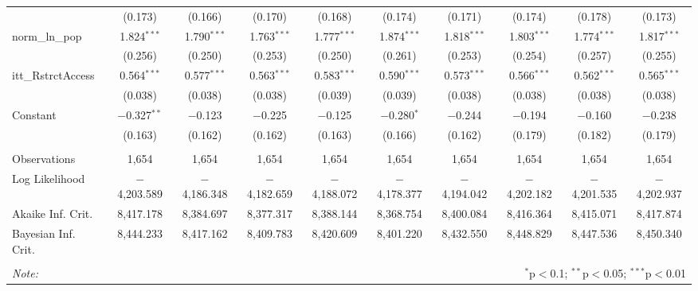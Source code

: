 \begin{sidewaystable}[!htbp]
\begin{tabular}{@{\extracolsep{5pt}}lccccccccc}
  & (0.173) & (0.166) & (0.170) & (0.168) & (0.174) & (0.171) & (0.174) & (0.178) & (0.173) \\ 
  norm\_ln\_pop & 1.824$^{***}$ & 1.790$^{***}$ & 1.763$^{***}$ & 1.777$^{***}$ & 1.874$^{***}$ & 1.818$^{***}$ & 1.803$^{***}$ & 1.774$^{***}$ & 1.817$^{***}$ \\ 
  & (0.256) & (0.250) & (0.253) & (0.250) & (0.261) & (0.253) & (0.254) & (0.257) & (0.255) \\ 
  itt\_RstrctAccess & 0.564$^{***}$ & 0.577$^{***}$ & 0.563$^{***}$ & 0.583$^{***}$ & 0.590$^{***}$ & 0.573$^{***}$ & 0.566$^{***}$ & 0.562$^{***}$ & 0.565$^{***}$ \\ 
  & (0.038) & (0.038) & (0.038) & (0.039) & (0.039) & (0.038) & (0.038) & (0.038) & (0.038) \\ 
  Constant & $-$0.327$^{**}$ & $-$0.123 & $-$0.225 & $-$0.125 & $-$0.280$^{*}$ & $-$0.244 & $-$0.194 & $-$0.160 & $-$0.238 \\ 
  & (0.163) & (0.162) & (0.162) & (0.163) & (0.166) & (0.162) & (0.179) & (0.182) & (0.179) \\ 
 \hline \\[-1.8ex] 
Observations & 1,654 & 1,654 & 1,654 & 1,654 & 1,654 & 1,654 & 1,654 & 1,654 & 1,654 \\ 
Log Likelihood & $-$4,203.589 & $-$4,186.348 & $-$4,182.659 & $-$4,188.072 & $-$4,178.377 & $-$4,194.042 & $-$4,202.182 & $-$4,201.535 & $-$4,202.937 \\ 
Akaike Inf. Crit. & 8,417.178 & 8,384.697 & 8,377.317 & 8,388.144 & 8,368.754 & 8,400.084 & 8,416.364 & 8,415.071 & 8,417.874 \\ 
Bayesian Inf. Crit. & 8,444.233 & 8,417.162 & 8,409.783 & 8,420.609 & 8,401.220 & 8,432.550 & 8,448.829 & 8,447.536 & 8,450.340 \\ 
\hline 
\hline \\[-1.8ex] 
\textit{Note:}  & \multicolumn{9}{r}{$^{*}$p$<$0.1; $^{**}$p$<$0.05; $^{***}$p$<$0.01} \\ 
\end{tabular} 
\end{sidewaystable} 
